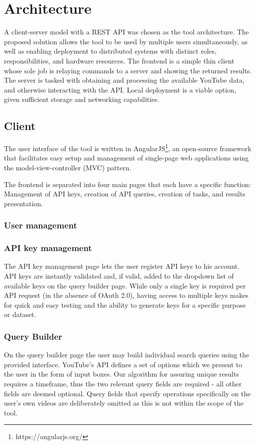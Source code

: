 \section{Architecture}
A client-server model with a REST API was chosen as the tool architecture. The
proposed solution allows the tool to be used by multiple users simultaneously,
as well as enabling deployment to distributed systems with distinct roles,
responsibilities, and hardware resources.
The frontend is a simple thin client whose sole job is relaying commands to a
server and showing the returned results. The server is tasked with obtaining
and processing the available YouTube data, and otherwise interacting with the
API.
Local deployment is a viable option, given sufficient storage and networking
capabilities.


\subsection{Client}
The user interface of the tool is written in
AngularJS\footnote{https://angularjs.org/}, an open-source framework that
facilitates easy setup and management of single-page web applications using the
model-view-controller (MVC) pattern.

The frontend is separated into four main pages that each have a specific
function: Management of API keys, creation of API queries, creation of tasks,
and results presentation.


\subsubsection{User management}


\subsubsection{API key management}
The API key management page lets the user register API keys to his account.
API keys are instantly validated and, if valid, added to the dropdown list of
available keys on the query builder page.
While only a single key is required per API request (in the absence of OAuth
2.0), having access to multiple keys makes for quick and easy testing and the
ability to generate keys for a specific purpose or dataset.

\subsubsection{Query Builder}
On the query builder page the user may build individual search queries using
the provided interface. YouTube's API defines a set of options which we present
to the user in the form of input boxes. Our algorithm for assuring unique
results requires a timeframe, thus the two relevant query fields are required - 
all other fields are deemed optional. Query fields that specify operations
specifically on the user's own videos are deliberately omitted as this is
not within the scope of the tool.

